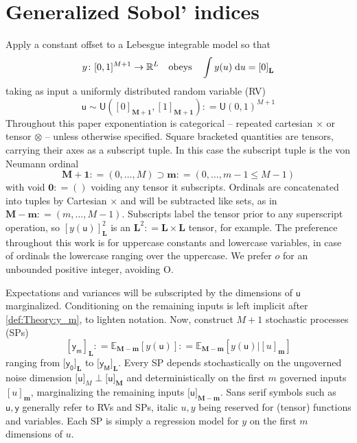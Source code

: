 \documentclass[preprint,12pt]{elsarticle}
\newcommand*{\M}[1]{\ensuremath{#1}\xspace}
\newcommand*{\x}{\times}
\newcommand*{\mi}[1]{\mathbf{#1}}
\newcommand*{\st}[1]{\mathbb{#1}}
\newcommand*{\rv}[1]{\mathsf{#1}}
\newcommand*{\te}[2][]{\left\lbrack{#2}\right\rbrack_{#1}}
\newcommand*{\tte}[2][]{\lbrack{#2}\rbrack_{#1}}
\newcommand*{\deq}{\M{\mathrel{\mathop:}=}}
\newcommand{\T}[1]{\text{#1}}
\newcommand*{\QT}[2][]{\M{\quad\T{#2}\ifthenelse{\equal{#1}{}}{\quad}{#1}}}
\newcommand*{\ev}[3][]{\mathbb{E}_{#3}^{#1}\!\left\lbrack{#2}\right\rbrack}
\newcommand*{\uni}[2]{\mathsf{U}\!\left({#1,#2}\right)}
\newcommand*{\uniti}{\lbrack 0,1\rbrack}
\begin{document}
\section{Generalized Sobol' indices}\label{sec:GSI}
    Apply a constant offset to a Lebesgue integrable model so that
    \begin{equation} \label{def:GSI:y}
        y \colon \uniti^{M+1} \rightarrow \st{R}^{L} \QT{obeys} \int y(u) \; \mathrm{d}u = \te[\mi{L}]{0}
    \end{equation}
    taking as input a uniformly distributed random variable (RV)
    \begin{equation} \label{def:GSI:u}
        \rv{u} \sim \uni{\te[\mi{M+1}]{0}}{\te[\mi{M+1}]{1}} \deq \uni{0}{1}^{M+1}
    \end{equation}
    Throughout this paper exponentiation is categorical -- repeated cartesian $\x$ or tensor $\otimes$ -- unless otherwise specified. Square bracketed quantities are tensors, carrying their axes as a subscript tuple. In this case the subscript tuple is the von Neumann ordinal
    \begin{equation*}
        \mi{M+1} \deq (0,\ldots,M) \supset \mi{m} \deq (0,\ldots,m-1 \leq M-1)
    \end{equation*}
    with void $\mi{0}\deq ()$ voiding any tensor it subscripts. Ordinals are concatenated into tuples by Cartesian $\times$ and will be subtracted like sets, as in $\mi{M-m} \deq (m,\ldots,M-1)$. 
    Subscripts label the tensor prior to any superscript operation, so $\te[\mi{L}]{y(\rv{u})}^{2}$ is an $\mi{L}^{2} \deq \mi{L\x L}$ tensor, for example.
    The preference throughout this work is for uppercase constants and lowercase variables, in case of ordinals the lowercase ranging over the uppercase. We prefer $o$ for an unbounded positive integer, avoiding O.

    Expectations and variances will be subscripted by the dimensions of $\rv{u}$ marginalized. Conditioning on the remaining inputs is left implicit after \cref{def:Theory:y_m}, to lighten notation.
    Now, construct $M+1$ stochastic processes (SPs)
    \begin{equation}\label{def:Theory:y_m}
        \te[\mi{L}]{\rv{y_m}} \deq \ev{y(\rv{u})}{\mi{M-m}} \deq \ev{y(\rv{u}) \big\vert \te[\mi{m}]{u}}{\mi{M-m}}
    \end{equation}
    ranging from $\tte[\mi{L}]{\rv{y_0}}$ to $\tte[\mi{L}]{\rv{y_M}}$. Every SP depends stochastically on the ungoverned noise dimension $\tte[M]{\rv{u}} \perp \tte[\mi{M}]{\rv{u}}$ and deterministically on the first $m$ governed inputs $\te[\mi{m}]{u}$, marginalizing the remaining inputs $\tte[\mi{M-m}]{\rv{u}}$. 
    Sans serif symbols such as $\rv{u,y}$ generally refer to RVs and SPs, italic $u,y$ being reserved for (tensor) functions and variables. Each SP is simply a regression model for $y$ on the first $m$ dimensions of $u$.
    
\end{document}
